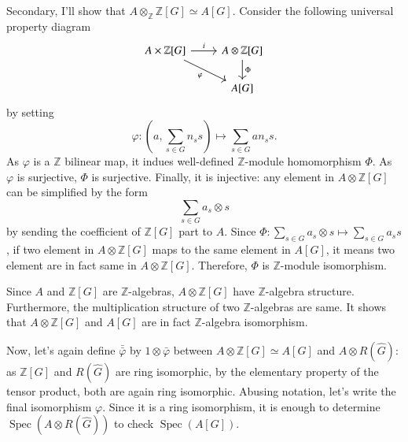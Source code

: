 \documentclass[a4paper, 12pt]{article}
\theoremstyle{Mydefinition}
\theoremstyle{Mytheorem}
\DeclareMathOperator{\Spec}{Spec}
\begin{document}
Secondary, I'll show that $A\otimes_{\mathbb{Z}} \mathbb{Z}[G]\simeq A[G]$. Consider the following universal property diagram
\[
  \begin{tikzcd}
    A\times \mathbb{Z}[G] \arrow{r}{i} \arrow[swap]{dr}{\varphi} & A\otimes \mathbb{Z}[G] \arrow{d}{\Phi} \\
     & A[G]
  \end{tikzcd}
\]
by setting
\begin{equation}
    \varphi:(a,\sum_{s\in G}n_s s)\mapsto \sum_{s\in G}an_s s.
\end{equation}
As $\varphi$ is a $\mathbb{Z}$ bilinear map, it indues well-defined $\mathbb{Z}$-module homomorphism $\Phi$. As $\varphi$ is surjective, $\Phi$ is surjective. Finally, it is injective: any element in $A\otimes \mathbb{Z}[G]$ can be simplified by the form
\begin{equation}
    \sum_{s\in G} a_s\otimes s
\end{equation}
by sending the coefficient of $\mathbb{Z}[G]$ part to $A$. Since $\Phi:\sum_{s\in G} a_s\otimes s\mapsto \sum_{s\in G}a_s s$, if two element in $A\otimes \mathbb{Z}[G]$ maps to the same element in $A[G]$, it means two element are in fact same in $A\otimes \mathbb{Z}[G]$. Therefore, $\Phi$ is $\mathbb{Z}$-module isomorphism.

Since $A$ and $\mathbb{Z}[G]$ are $\mathbb{Z}$-algebras, $A\otimes \mathbb{Z}[G]$ have $\mathbb{Z}$-algebra structure. Furthermore, the multiplication structure of two $\mathbb{Z}$-algebras are same. It shows that $A\otimes \mathbb{Z}[G]$ and $A[G]$ are in fact $\mathbb{Z}$-algebra isomorphism.

Now, let's again define $\bar{\bar{\varphi}}$ by $1\otimes \bar{\varphi}$ between $A\otimes \mathbb{Z}[G]\simeq A[G]$ and $A\otimes R(\hat{G})$: as $\mathbb{Z}[G]$ and $R(\hat{G})$ are ring isomorphic, by the elementary property of the tensor product, both are again ring isomorphic. Abusing notation, let's write the final isomorphism $\varphi$. Since it is a ring isomorphism, it is enough to determine $\Spec(A\otimes R(\hat{G}))$ to check $\Spec(A[G])$.
\end{document}
